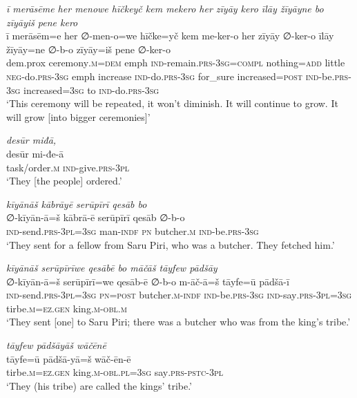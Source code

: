 \ea \label{ŽP.245}
\textit{ī merāsēme her menowe hīčkeyč kem mekero her zīyāy kero īlāy žīyāyne bo zīyāyiš pene kero} \\ 
\gll ī merāsēm=e her ∅-men-o=we hīčke=yč kem me-ker-o her zīyāy ∅-ker-o īlāy žīyāy=ne ∅-b-o zīyāy=iš pene ∅-ker-o \\ 
 dem.prox ceremony\textsc{.m}\textsc{=dem} emph \textsc{ind-}remain\textsc{.prs}\textsc{-3sg}\textsc{=compl} nothing\textsc{=add} little \textsc{neg-}do\textsc{.prs}\textsc{-3sg} emph increase \textsc{ind-}do\textsc{.prs}\textsc{-3sg} for\_sure increased\textsc{=\textsc{post}} \textsc{ind-}be\textsc{.prs}\textsc{-3sg} increased\textsc{=3sg} to \textsc{ind-}do\textsc{.prs}\textsc{-3sg} \\ 
\glt `This ceremony will be repeated, it won’t diminish. It will continue to grow. It will grow [into bigger ceremonies]'
\z 
 
\ea \label{ŽP.246}
\textit{desūr miđā,} \\ 
\gll desūr mi-đe-ā \\ 
 task/order\textsc{.m} \textsc{ind-}give\textsc{.prs}\textsc{-3pl} \\ 
\glt `They [the people] ordered.'
\z 
 
\ea \label{ŽP.250}
\textit{kīyānāš kābrāyē serūpīrī qesāb bo} \\ 
\gll ∅-kīyān-ā=š kābrā-ē serūpīrī qesāb ∅-b-o \\ 
 \textsc{ind-}send\textsc{.prs}\textsc{-3pl}\textsc{=3sg} man\textsc{-indf} \textsc{pn} butcher\textsc{.m} \textsc{ind-}be\textsc{.prs}\textsc{-3sg} \\ 
\glt `They sent for a fellow from Saru Piri, who was a butcher. They fetched him.'
\z 
 
\ea \label{ŽP.251}
\textit{kīyānāš serūpīrīwe qesābē bo māčāš tāyfew pādšāy} \\ 
\gll ∅-kīyān-ā=š serūpīrī=we qesāb-ē ∅-b-o m-āč-ā=š tāyfe=ū pādšā-ī \\ 
 \textsc{ind-}send\textsc{.prs}\textsc{-3pl}\textsc{=3sg} \textsc{pn}\textsc{=\textsc{post}} butcher\textsc{.m}\textsc{-indf} \textsc{ind-}be\textsc{.prs}\textsc{-3sg} \textsc{ind-}say\textsc{.prs}\textsc{-3pl}\textsc{=3sg} tirbe\textsc{.m}\textsc{\textsc{=ez.gen}} king\textsc{.m}\textsc{-obl}\textsc{.m} \\ 
\glt `They sent [one] to Saru Piri; there was a butcher who was from the king’s tribe.'
\z 
 
\ea \label{ŽP.252}
\textit{tāyfew pādšāyāš wāčēnē} \\ 
\gll tāyfe=ū pādšā-yā=š wāč-ēn-ē \\ 
 tirbe\textsc{.m}\textsc{\textsc{=ez.gen}} king\textsc{.m}\textsc{-obl}\textsc{.pl}\textsc{=3sg} say\textsc{.prs-pstc-3pl} \\ 
\glt `They (his tribe) are called the kings’ tribe.'
\z 
 
